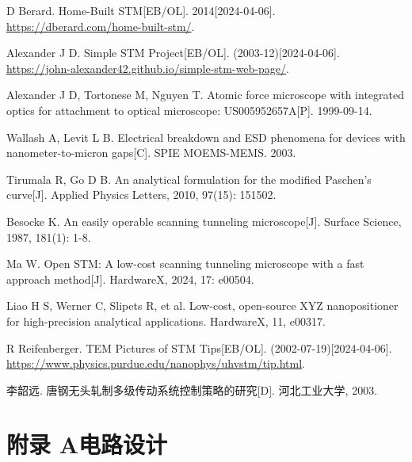 \documentclass{article}
\begin{document}
\begin{thebibliography}{25}
	 D Berard. Home-Built STM[EB/OL]. 2014[2024-04-06]. \href{https://dberard.com/home-built-stm/}{https://dberard.com/home-built-stm/}.

	 Alexander J D. Simple STM Project[EB/OL]. (2003-12)[2024-04-06]. \href{https://john-alexander42.github.io/simple-stm-web-page/}{https://john-alexander42.github.io/simple-stm-web-page/}.

	 Alexander J D, Tortonese M, Nguyen T. Atomic force microscope with integrated optics for attachment to optical microscope: US005952657A[P]. 1999-09-14.

	 Wallash A, Levit L B. Electrical breakdown and ESD phenomena for devices with nanometer-to-micron gaps[C]. SPIE MOEMS-MEMS. 2003.

	 Tirumala R, Go D B. An analytical formulation for the modified Paschen’s curve[J]. Applied Physics Letters, 2010, 97(15): 151502.

	 Besocke K. An easily operable scanning tunneling microscope[J]. Surface Science, 1987, 181(1): 1-8.

	 Ma W. Open STM: A low-cost scanning tunneling microscope with a fast approach method[J]. HardwareX, 2024, 17: e00504.

	 Liao H S, Werner C, Slipets R, et al. Low-cost, open-source XYZ nanopositioner for high-precision analytical applications. HardwareX, 11, e00317.

	 R Reifenberger. TEM Pictures of STM Tips[EB/OL]. (2002-07-19)[2024-04-06]. \href{https://www.physics.purdue.edu/nanophys/uhvstm/tip.html}{https://www.physics.purdue.edu/nanophys/uhvstm/tip.html}.

	 李韶远. 唐钢无头轧制多级传动系统控制策略的研究[D]. 河北工业大学, 2003.

\end{thebibliography}



\newpage
\appendix
\section*{附录 A\quad 电路设计}
\label{app:A}
\end{document}
